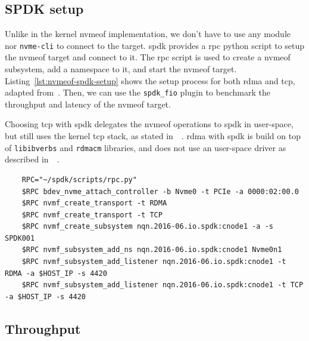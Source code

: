 \subsection{SPDK setup}

Unlike in the kernel \acrshort{nvmeof} implementation, we don't have to use any module nor \texttt{nvme-cli} to connect to the target. \acrshort{spdk} provides a \acrfull{rpc} python script to setup the \acrshort{nvmeof} target and connect to it. The \acrshort{rpc} script is used to create a \acrshort{nvmeof} subsystem, add a namespace to it, and start the \acrshort{nvmeof} target. Listing~\ref{lst:nvmeof-spdk-setup} shows the setup process for both \acrshort{rdma} and \acrshort{tcp}, adapted from~\cite{spdk_nvmf_tgt}. Then, we can use the \texttt{spdk\_fio} plugin to benchmark the throughput and latency of the \acrshort{nvmeof} target.

Choosing \acrshort{tcp} with \acrshort{spdk} delegates the \acrshort{nvmeof} operations to \acrshort{spdk} in user-space, but still uses the kernel \acrshort{tcp} stack, as stated in~~\cite{latecki_spdk_nodate}. \acrshort{rdma} with \acrshort{spdk} is build on top of \texttt{libibverbs} and \texttt{rdmacm} libraries, and does not use an user-space driver as described in~~\cite{spdk_nvmf_tgt_pg}.

\begin{listing}[htbp]
    \centering
    \begin{verbatim}
    RPC="~/spdk/scripts/rpc.py" 
    $RPC bdev_nvme_attach_controller -b Nvme0 -t PCIe -a 0000:02:00.0 
    $RPC nvmf_create_transport -t RDMA
    $RPC nvmf_create_transport -t TCP
    $RPC nvmf_create_subsystem nqn.2016-06.io.spdk:cnode1 -a -s SPDK001
    $RPC nvmf_subsystem_add_ns nqn.2016-06.io.spdk:cnode1 Nvme0n1
    $RPC nvmf_subsystem_add_listener nqn.2016-06.io.spdk:cnode1 -t RDMA -a $HOST_IP -s 4420
    $RPC nvmf_subsystem_add_listener nqn.2016-06.io.spdk:cnode1 -t TCP -a $HOST_IP -s 4420
    \end{verbatim}
    \caption{Setup of NVMe-over-Fabrics target with SPDK}
    \label{lst:nvmeof-spdk-setup}
\end{listing}

\subsection{Throughput}

